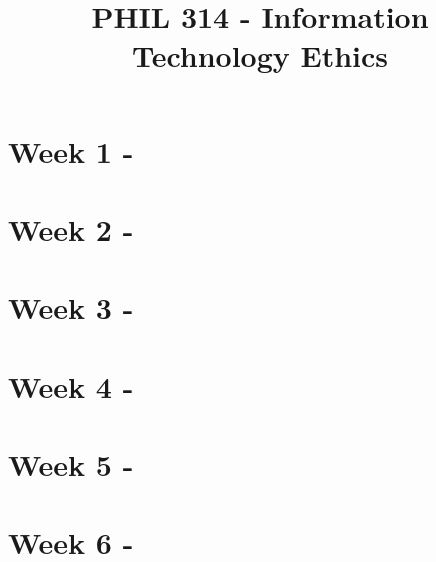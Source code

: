 \documentclass{article}
\title{PHIL 314 - Information Technology Ethics}
\begin{document}
\maketitle
\tableofcontents

\section{Week 1 - }

\section{Week 2 - }

\section{Week 3 - }

\section{Week 4 - }

\section{Week 5 - }

\section{Week 6 - }
\end{document}
